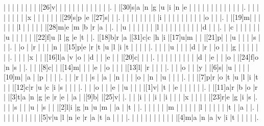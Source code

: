 \documentclass[12pt]{article}
\begin{document}
\begin{Puzzle}{22}{24}
  |{}  |{}  |{}  |{}  |{}  |{}  |{}  |{}  |[26]v|{}  |{}  |{}  |{}  |{}  |{}  |{}  |{}  |{}  |{}  |{}  |{}  |.
  |{}  |[30]s|a   |n   |g   |u   |i   |n   |e   |{}  |{}  |{}  |{}  |{}  |{}  |{}  |{}  |{}  |{}  |{}  |{}  |.
  |{}  |{}  |{}  |{}  |{}  |{}  |{}  |{}  |x   |{}  |{}  |{}  |{}  |{}  |{}  |[29]s|p   |e   |[27]s|{}  |{}  |.
  |{}  |{}  |{}  |{}  |{}  |{}  |{}  |{}  |i   |{}  |{}  |{}  |{}  |{}  |{}  |{}  |{}  |{}  |o   |{}  |{}  |.
  |{}  |[19]m|{}  |{}  |{}  |{}  |{}  |{}  |l   |{}  |{}  |{}  |{}  |{}  |[28]m|e   |m   |b   |r   |a   |{}  |.
  |{}  |u   |{}  |{}  |{}  |{}  |{}  |{}  |l   |{}  |{}  |{}  |{}  |{}  |{}  |{}  |{}  |{}  |d   |{}  |{}  |.
  |{}  |c   |{}  |{}  |{}  |{}  |{}  |{}  |u   |{}  |{}  |{}  |{}  |{}  |[22]f|u   |l   |g   |e   |t   |{}  |.
  |[18]b|r   |a   |[31]c|c   |h   |i   |[17]u|m   |{}  |{}  |[21]p|{}  |{}  |u   |{}  |{}  |{}  |s   |{}  |{}  |.
  |{}  |o   |{}  |r   |{}  |{}  |{}  |n   |{}  |[15]p|e   |r   |t   |u   |l   |i   |t   |{}  |{}  |{}  |{}  |.
  |{}  |{}  |{}  |u   |{}  |{}  |{}  |d   |{}  |r   |{}  |o   |{}  |{}  |g   |{}  |{}  |{}  |{}  |{}  |{}  |.
  |{}  |{}  |{}  |x   |{}  |{}  |[16]l|a   |v   |o   |{}  |d   |{}  |{}  |e   |{}  |{}  |[20]c|{}  |{}  |{}  |.
  |{}  |{}  |{}  |{}  |{}  |{}  |{}  |{}  |{}  |d   |{}  |e   |{}  |{}  |o   |{}  |[24]f|o   |n   |s   |{}  |.
  |{}  |{}  |[8]c|{}  |{}  |[14]m|{}  |{}  |{}  |e   |{}  |o   |{}  |{}  |{}  |[13]l|{}  |r   |{}  |{}  |{}  |.
  |{}  |{}  |o   |{}  |{}  |y   |{}  |[6]s|{}  |u   |{}  |{}  |{}  |[10]m|{}  |a   |{}  |p   |{}  |{}  |{}  |.
  |{}  |{}  |r   |{}  |{}  |s   |{}  |a   |{}  |n   |{}  |{}  |{}  |o   |{}  |n   |{}  |u   |{}  |{}  |{}  |.
  |{}  |{}  |[7]p|r   |o   |t   |u   |l   |i   |t   |{}  |{}  |[12]c|r   |u   |c   |i   |s   |{}  |{}  |{}  |.
  |{}  |{}  |o   |{}  |{}  |e   |{}  |u   |{}  |{}  |{}  |[1]v|{}  |t   |{}  |e   |{}  |{}  |{}  |{}  |{}  |.
  |{}  |[11]a|r   |b   |o   |r   |{}  |[3]t|a   |n   |g   |e   |r   |e   |{}  |a   |{}  |[9]b|{}  |[25]v|{}  |.
  |{}  |{}  |i   |{}  |{}  |i   |{}  |i   |{}  |{}  |{}  |x   |{}  |{}  |{}  |{}  |[23]r|e   |g   |i   |s   |.
  |{}  |{}  |s   |{}  |{}  |u   |{}  |s   |{}  |{}  |[2]l|i   |g   |n   |u   |m   |{}  |a   |{}  |t   |{}  |.
  |{}  |{}  |{}  |{}  |{}  |m   |{}  |{}  |{}  |{}  |{}  |l   |{}  |{}  |{}  |{}  |{}  |t   |{}  |a   |{}  |.
  |{}  |{}  |{}  |{}  |{}  |{}  |{}  |{}  |{}  |[5]v|u   |l   |n   |e   |r   |a   |t   |a   |{}  |{}  |{}  |.
  |{}  |{}  |{}  |{}  |{}  |{}  |{}  |{}  |{}  |{}  |[4]m|a   |n   |a   |v   |i   |t   |{}  |{}  |{}  |{}  |.
\end{Puzzle}
\end{document}

